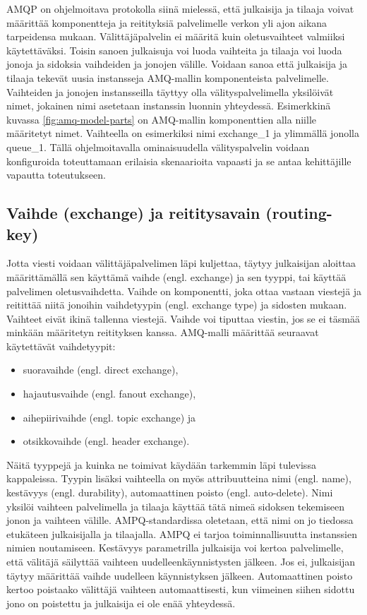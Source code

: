 AMQP on ohjelmoitava protokolla siinä mielessä, että julkaisija ja tilaaja voivat määrittää komponentteja ja reitityksiä palvelimelle verkon yli ajon aikana tarpeidensa mukaan. Välittäjäpalvelin ei määritä kuin oletusvaihteet valmiiksi käytettäväksi. Toisin sanoen julkaisuja voi luoda vaihteita ja tilaaja voi luoda jonoja ja sidoksia vaihdeiden ja jonojen välille. Voidaan sanoa että julkaisija ja tilaaja tekevät uusia instansseja AMQ-mallin komponenteista palvelimelle. Vaihteiden ja jonojen instansseilla täyttyy olla välityspalvelimella yksilöivät nimet, jokainen nimi asetetaan instanssin luonnin yhteydessä. Esimerkkinä kuvassa \ref{fig:amq-model-parts} on AMQ-mallin komponenttien alla niille määritetyt nimet. Vaihteella on esimerkiksi nimi exchange\_1 ja ylimmällä jonolla queue\_1. Tällä ohjelmoitavalla ominaisuudella välityspalvelin voidaan konfiguroida toteuttamaan erilaisia skenaarioita vapaasti ja se antaa kehittäjille vapautta toteutukseen.


\subsection{Vaihde (exchange) ja reititysavain (routing-key)}
Jotta viesti voidaan välittäjäpalvelimen läpi kuljettaa, täytyy julkaisijan aloittaa määrittämällä sen käyttämä vaihde (engl. exchange) ja sen tyyppi, tai käyttää palvelimen oletusvaihdetta. Vaihde on komponentti, joka ottaa vastaan viestejä ja reitittää niitä jonoihin vaihdetyypin (engl. exchange type) ja sidosten mukaan. Vaihteet eivät ikinä tallenna viestejä. Vaihde voi tiputtaa viestin, jos se ei täsmää minkään määritetyn reitityksen kanssa. AMQ-malli määrittää seuraavat käytettävät vaihdetyypit:
\begin{itemize}
	\item suoravaihde (engl. direct exchange),
	\item hajautusvaihde (engl. fanout exchange),
	\item aihepiirivaihde (engl. topic exchange) ja
	\item otsikkovaihde (engl. header exchange).
\end{itemize}

Näitä tyyppejä ja kuinka ne toimivat käydään tarkemmin läpi tulevissa kappaleissa. Tyypin lisäksi vaihteella on myös attribuutteina nimi (engl. name), kestävyys (engl. durability), automaattinen poisto (engl. auto-delete). Nimi yksilöi vaihteen palvelimella ja tilaaja käyttää tätä nimeä sidoksen tekemiseen jonon ja vaihteen välille. AMPQ-standardissa oletetaan, että nimi on jo tiedossa etukäteen julkaisijalla ja tilaajalla. AMPQ ei tarjoa toiminnallisuutta instanssien nimien noutamiseen. Kestävyys parametrilla julkaisija voi kertoa palvelimelle, että välitäjä säilyttää vaihteen uudelleenkäynnistysten jälkeen. Jos ei, julkaisijan täytyy määrittää vaihde uudelleen käynnistyksen jälkeen. Automaattinen poisto kertoo poistaako välittäjä vaihteen automaattisesti, kun viimeinen siihen sidottu jono on poistettu ja julkaisija ei ole enää yhteydessä.

